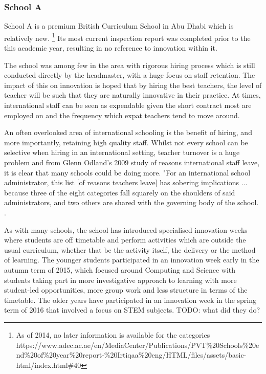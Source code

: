 \subsubsection{School A}
School A is a premium British Curriculum School in Abu Dhabi which is relatively new. \footnote{As of 2014, no later information is available for the categories https://www.adec.ac.ae/en/MediaCenter/Publications/PVT\%20Schools\%20end\%20of\%20year\%20report-\%20Irtiqaa\%20eng/HTML/files/assets/basic-html/index.html\#40}  Its most current inspection report was completed prior to the this academic year, resulting in no reference to innovation within it.

The school was among few in the area with rigorous hiring process which is still conducted directly by the headmaster, with a huge focus on staff retention. The impact of this on innovation is hoped that by hiring the best teachers, the level of teacher will be such that they are naturally innovative in their practice. At times, international staff can be seen as expendable given the short contract most are employed on and the frequency which expat teachers tend to move around.

An often overlooked area of international schooling is the benefit of hiring, and more importantly, retaining high quality staff. Whilst not every school can be selective when hiring in an international setting, teacher turnover is a huge problem and from Glenn Odland's 2009 study of reasons international staff leave, it is clear that many schools could be doing more. "For an international school administrator, this list [of reasons teachers leave] has sobering implications ... because three of the eight categories fall squarely on the shoulders of said administrators, and two others are shared with the governing body of the school. \cite[p. 23]{Odland2009}. 

As with many schools, the school has introduced specialised innovation weeks where students are off timetable and perform activities which are outside the usual curriculum, whether that be the activity itself, the delivery or the method of learning. The younger students participated in an innovation week early in the autumn term of 2015, which focused around Computing and Science with students taking part in more investigative approach to learning with more student-led opportunities, more group work and less structure in terms of the timetable. The older years have participated in an innovation week in the spring term of 2016 that involved a focus on STEM subjects. TODO: what did they do?

